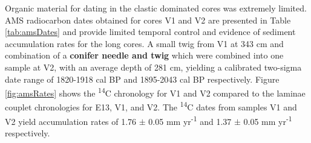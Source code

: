 \documentclass[Royal,times,doublespace,sageh]{sagej}
\begin{document}
Organic material for dating in the clastic dominated cores was extremely
limited. AMS radiocarbon dates obtained for cores V1 and V2 are
presented in Table \ref{tab:amsDates} and provide limited temporal
control and evidence of sediment accumulation rates for the long cores.
A small twig from V1 at 343 cm and combination of a \textbf{conifer
needle and twig} which were combined into one sample at V2, with an
average depth of 281 cm, yielding a calibrated \citep{Reimer2013}
two-sigma date range of 1820-1918 cal BP and 1895-2043 cal BP
respectively. Figure \ref{fig:amsRates} shows the \textsuperscript{14}C
chronology for V1 and V2 compared to the laminae couplet chronologies
for E13, V1, and V2. The \textsuperscript{14}C dates from samples V1 and
V2 yield accumulation rates of 1.76 \(\pm\) 0.05 mm
yr\textsuperscript{-1} and 1.37 \(\pm\) 0.05 mm yr\textsuperscript{-1}
respectively.
\end{document}
